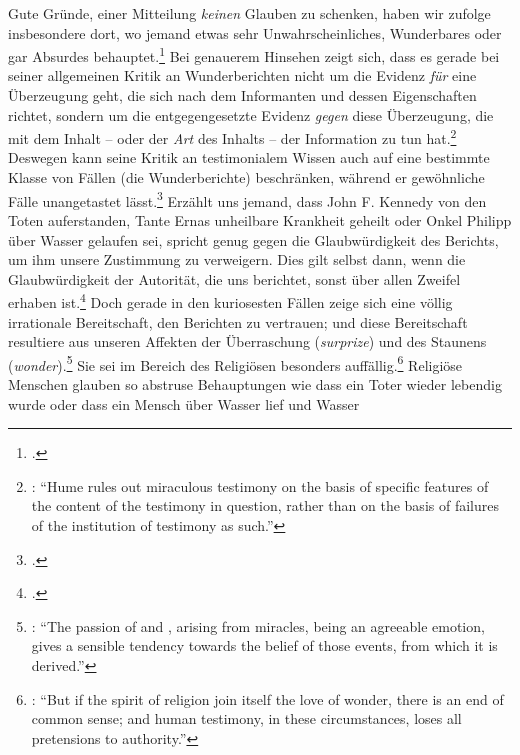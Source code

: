 Gute Gründe, einer Mitteilung \emph{keinen} Glauben zu schenken, haben wir
 zufolge insbesondere dort, wo jemand etwas sehr
Unwahrscheinliches, Wunderbares oder gar Absurdes
behauptet.\footnote{\cite[Vgl.][88--94]{Hume:AnEnquiryConcerningHumanUnderstanding1964}.}
Bei genauerem Hinsehen zeigt sich, dass es  gerade bei seiner
allgemeinen Kritik an Wunderberichten nicht um die Evidenz \emph{für} eine
Überzeugung geht, die sich nach dem Informanten und dessen Eigenschaften
richtet, sondern um die entgegengesetzte Evidenz \emph{gegen} diese Überzeugung,
die mit dem Inhalt -- oder der \emph{Art} des Inhalts -- der Information zu tun
hat.\footnote{\cite[Vgl.][68]{Gelfert:HumeonTestimonyRevisited2010}:
\enquote{Hume rules out miraculous testimony on the basis of specific features
of the content of the testimony in question, rather than on the basis of
failures of the institution of testimony as such.}} Deswegen kann 
seine Kritik an testimonialem Wissen auch auf eine bestimmte Klasse von Fällen
(die Wunderberichte) beschränken, während er gewöhnliche Fälle unangetastet
lässt.\footnote{\cite[Vgl.][74]{Gelfert:HumeonTestimonyRevisited2010}.} Erzählt
uns jemand, dass John F. Kennedy von den Toten auferstanden, Tante Ernas
unheilbare Krankheit geheilt oder Onkel Philipp über Wasser gelaufen sei,
spricht genug gegen die Glaubwürdigkeit des Berichts, um ihm unsere Zustimmung
zu verweigern. Dies gilt selbst dann, wenn die Glaubwürdigkeit der Autorität,
die uns berichtet, sonst über allen Zweifel erhaben
ist.\footnote{\cite[Vgl.][92]{Hume:AnEnquiryConcerningHumanUnderstanding1964}.}
Doch gerade in den kuriosesten Fällen zeige sich eine völlig irrationale
Bereitschaft, den Berichten zu vertrauen; und diese Bereitschaft resultiere aus
unseren Affekten der Überraschung (\emph{surprize}) und des Staunens
(\emph{wonder}).\footnote{\cite[Vgl.][95]{Hume:AnEnquiryConcerningHumanUnderstanding1964}:
\enquote{The passion of  and , arising from miracles,
being an agreeable emotion, gives a sensible tendency towards the belief of
those events, from which it is derived.}} Sie sei im Bereich des Religiösen
besonders
auffällig.\footnote{\cite[Vgl.][95]{Hume:AnEnquiryConcerningHumanUnderstanding1964}:
\enquote{But if the spirit of religion join itself the love of wonder, there is
an end of common sense; and human testimony, in these circumstances, loses all
pretensions to authority.}} Religiöse Menschen glauben so abstruse Behauptungen
wie dass ein Toter wieder lebendig wurde oder dass ein Mensch über Wasser lief und Wasser

